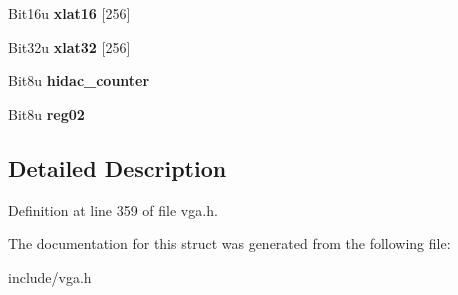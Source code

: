\begin{DoxyCompactItemize}
\item 
\hypertarget{structVGA__Dac_a0ecbd2205771f2bd6eeda1e799f17597}{Bit16u {\bfseries xlat16} \mbox{[}256\mbox{]}}\label{structVGA__Dac_a0ecbd2205771f2bd6eeda1e799f17597}

\item 
\hypertarget{structVGA__Dac_a9bd0942c9ea49acc3d4055ffd6115901}{Bit32u {\bfseries xlat32} \mbox{[}256\mbox{]}}\label{structVGA__Dac_a9bd0942c9ea49acc3d4055ffd6115901}

\item 
\hypertarget{structVGA__Dac_acb8aaed4d1da7f09f5875bc6d4907721}{Bit8u {\bfseries hidac\-\_\-counter}}\label{structVGA__Dac_acb8aaed4d1da7f09f5875bc6d4907721}

\item 
\hypertarget{structVGA__Dac_a5d62487fbce7e19eaeb97eb8685dd301}{Bit8u {\bfseries reg02}}\label{structVGA__Dac_a5d62487fbce7e19eaeb97eb8685dd301}

\end{DoxyCompactItemize}


\subsection{Detailed Description}


Definition at line 359 of file vga.\-h.



The documentation for this struct was generated from the following file\-:\begin{DoxyCompactItemize}
\item 
include/vga.\-h\end{DoxyCompactItemize}
